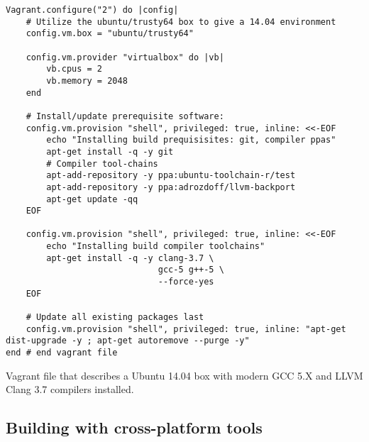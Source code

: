 \begin{listing}[tp]
\begin{verbatim}
Vagrant.configure("2") do |config|
    # Utilize the ubuntu/trusty64 box to give a 14.04 environment
    config.vm.box = "ubuntu/trusty64"
    
    config.vm.provider "virtualbox" do |vb|
        vb.cpus = 2
        vb.memory = 2048
    end
    
    # Install/update prerequisite software:
    config.vm.provision "shell", privileged: true, inline: <<-EOF
        echo "Installing build prequisisites: git, compiler ppas"
        apt-get install -q -y git 
        # Compiler tool-chains
        apt-add-repository -y ppa:ubuntu-toolchain-r/test 
        apt-add-repository -y ppa:adrozdoff/llvm-backport 
        apt-get update -qq
    EOF
    
    config.vm.provision "shell", privileged: true, inline: <<-EOF
        echo "Installing build compiler toolchains"
        apt-get install -q -y clang-3.7 \
                              gcc-5 g++-5 \
                              --force-yes
    EOF
    
    # Update all existing packages last
    config.vm.provision "shell", privileged: true, inline: "apt-get dist-upgrade -y ; apt-get autoremove --purge -y"
end # end vagrant file 
\end{verbatim}
\caption{Vagrant file that describes a Ubuntu 14.04 box with modern GCC 5.X and LLVM Clang 3.7 compilers installed.}
\label{lst:cross-platform:ubuntu-vagrant-box}
\end{listing} 

\subsection{Building with cross-platform tools}

